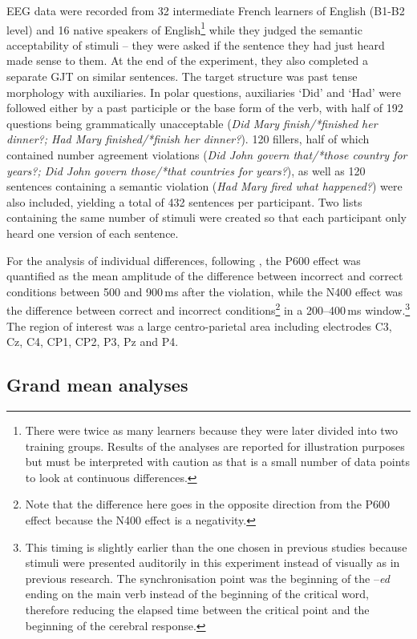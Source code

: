 \documentclass[output=paper,colorlinks,citecolor=brown,modfonts,nonflat]{../langscibook}
\begin{document}
EEG data were recorded from 32 intermediate French learners of English (B1-B2 level) and 16 native speakers of English\footnote{{There were twice as many learners because they were later divided into two training groups. Results of the analyses are reported for illustration purposes but must be interpreted with caution as that is a small number of data points to look at continuous differences.}} while they judged the semantic acceptability of stimuli – they were asked if the sentence they had just heard made sense to them. At the end of the experiment, they also completed a separate GJT on similar sentences. The target structure was past tense morphology with auxiliaries. In polar questions, auxiliaries ‘Did’ and ‘Had’ were followed either by a past participle or the base form of the verb, with half of 192 questions being grammatically unacceptable (\textit{Did Mary finish/*finished her dinner?; Had Mary finished/*finish her dinner?}). 120 fillers, half of which contained number agreement violations (\textit{Did John govern that/*those country for years?; Did John govern those/*that countries for years?}), as well as 120 sentences containing a semantic violation (\textit{Had Mary fired what happened?}) were also included, yielding a total of 432 sentences per participant. Two lists containing the same number of stimuli were created so that each participant only heard one version of each sentence.

For the analysis of individual differences, following \citet{TannerEtAl2014}, the P600 effect was quantified as the mean amplitude of the difference between incorrect and correct conditions between 500 and 900\,ms after the violation, while the N400 effect was the difference between correct and incorrect conditions\footnote{{Note that the difference here goes in the opposite direction from the P600 effect because the N400 effect is a negativity.}} in a 200--400\,ms window.\footnote{{This timing is slightly earlier than the one chosen in previous studies because stimuli were presented auditorily in this experiment instead of visually as in previous research. The synchronisation point was the beginning of the –}{\textit{ed}} {ending on the main verb instead of the beginning of the critical word, therefore reducing the elapsed time between the critical point and the beginning of the cerebral response.}} The region of interest was a large centro-parietal area including electrodes C3, Cz, C4, CP1, CP2, P3, Pz and P4.

\subsection{Grand mean analyses}
\end{document}
